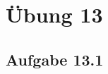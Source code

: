\documentclass{standalone}
\begin{document}
\section{Übung 13}
\subsection{Aufgabe 13.1}
\end{document}
